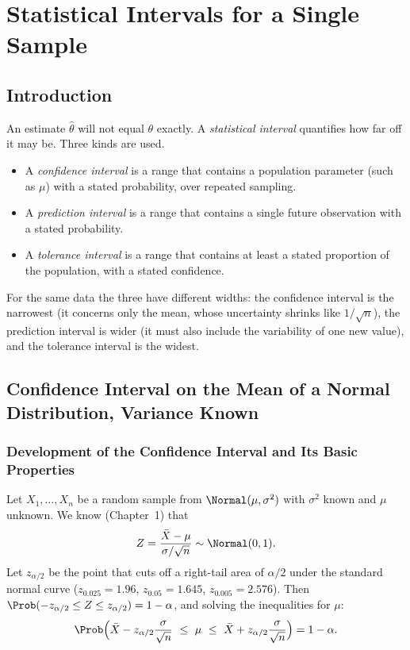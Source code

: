 \chapter{Statistical Intervals for a Single Sample}

\section{Introduction}

An estimate $\hat\theta$ will not equal $\theta$ exactly. A \emph{statistical interval} quantifies how far off it may be. Three kinds are used.

\begin{itemize}
  \item A \emph{confidence interval} is a range that contains a population parameter (such as $\mu$) with a stated probability, over repeated sampling.
  \item A \emph{prediction interval} is a range that contains a single future observation with a stated probability.
  \item A \emph{tolerance interval} is a range that contains at least a stated proportion of the population, with a stated confidence.
\end{itemize}

For the same data the three have different widths: the confidence interval is the narrowest (it concerns only the mean, whose uncertainty shrinks like $1/\sqrt n$), the prediction interval is wider (it must also include the variability of one new value), and the tolerance interval is the widest.

\section{Confidence Interval on the Mean of a Normal Distribution, Variance Known}

\subsection{Development of the Confidence Interval and Its Basic Properties}

Let $X_1,\dots,X_n$ be a random sample from $\Normal(\mu,\sigma^2)$ with $\sigma^2$ known and $\mu$ unknown. We know (Chapter~1) that
\[ Z=\frac{\bar{X}-\mu}{\sigma/\sqrt n}\sim\Normal(0,1). \]
Let $z_{\alpha/2}$ be the point that cuts off a right-tail area of $\alpha/2$ under the standard normal curve ($z_{0.025}=1.96$, $z_{0.05}=1.645$, $z_{0.005}=2.576$). Then $\Prob(-z_{\alpha/2}\le Z\le z_{\alpha/2})=1-\alpha$, and solving the inequalities for $\mu$:
\[ \Prob\Big(\bar{X}-z_{\alpha/2}\frac{\sigma}{\sqrt n}\ \le\ \mu\ \le\ \bar{X}+z_{\alpha/2}\frac\sigma{\sqrt n}\Big)=1-\alpha. \]

